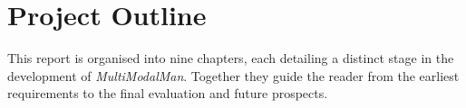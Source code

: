 \section{Project Outline}
This report is organised into nine chapters, each detailing a distinct stage in the development of \textit{MultiModalMan}. Together they guide the reader from the earliest requirements to the final evaluation and future prospects.

    
    
    
    
    
    
    
    
